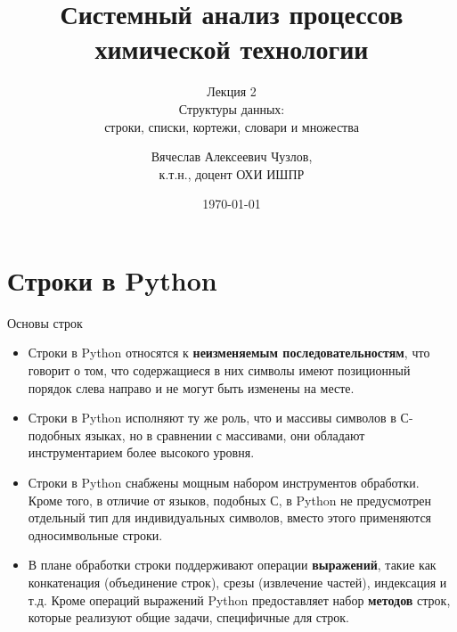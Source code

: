 \documentclass[aspectratio=169, mathserif]{beamer}%
\title{\LARGE{Системный анализ процессов химической технологии}}
\subtitle{Лекция 2 \\ Структуры данных: \\ строки, списки, кортежи, словари и множества}
\author[]{Вячеслав Алексеевич Чузлов, \\
к.т.н., доцент ОХИ ИШПР}
\date{\today}
\begin{document}
\newcommand{\pythoninline}[1]{%
	\colorbox{white}{%
		\parbox[b][.6em]{\widthof{\texttt{#1}}}{\texttt{#1}}%
	}%
}


\titleframe%

\tocframe{}%



\section{Строки в Python}
\sectionframe


\begin{frame}[fragile]{Основы строк}

\begin{itemize}
\scriptsize
\item Строки в Python относятся к \textcolor{extraorange}{\textbf{неизменяемым последовательностям}}, что говорит о том, что содержащиеся в них символы имеют позиционный порядок слева направо и не могут быть изменены на месте.

\item Строки в Python исполняют ту же роль, что и массивы символов в С-подобных языках, но в сравнении с массивами, они обладают инструментарием более высокого уровня. 

\item Строки в Python снабжены мощным набором инструментов обработки. Кроме того, в отличие от языков, подобных С, в Python не предусмотрен отдельный тип для индивидуальных символов, вместо этого применяются односимвольные строки.

\item В плане обработки строки поддерживают операции \textcolor{extraorange}{\textbf{выражений}}, такие как конкатенация (объединение строк), срезы (извлечение частей), индексация и т.д. Кроме операций выражений Python предоставляет набор \textcolor{extraorange}{\textbf{методов}} строк, которые реализуют общие задачи, специфичные для строк.
\end{itemize}

\vfill
\end{frame}
\end{document}
